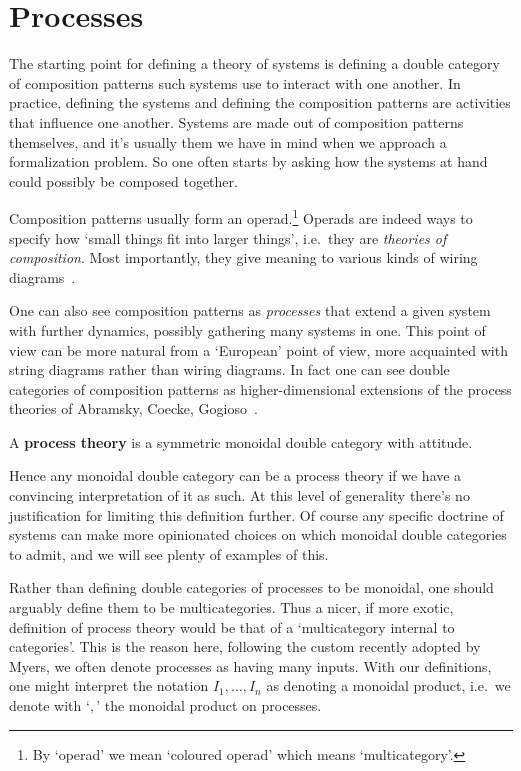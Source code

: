 \section{Processes}
The starting point for defining a theory of systems is defining a double category of composition patterns such systems use to interact with one another.
In practice, defining the systems and defining the composition patterns are activities that influence one another.
Systems are made out of composition patterns themselves, and it's usually them we have in mind when we approach a formalization problem.
So one often starts by asking how the systems at hand could possibly be composed together.

Composition patterns usually form an operad.\footnote{By `operad' we mean `coloured operad' which means `multicategory'.}
Operads are indeed ways to specify how `small things fit into larger things', i.e.~they are \emph{theories of composition}.
Most importantly, they give meaning to various kinds of wiring diagrams~\cite{spivak2013operad,vagner2014algebras, libkind2021operadic}.

One can also see composition patterns as \emph{processes} that extend a given system with further dynamics, possibly gathering many systems in one.
This point of view can be more natural from a `European' point of view, more acquainted with string diagrams rather than wiring diagrams.
In fact one can see double categories of composition patterns as higher-dimensional extensions of the process theories of Abramsky, Coecke, Gogioso~\cite{abramsky2004categorical, coecke2018picturing}.

\begin{definition}
	A \textbf{process theory} is a symmetric monoidal double category with attitude.
\end{definition}

Hence any monoidal double category can be a process theory if we have a convincing interpretation of it as such.
At this level of generality there's no justification for limiting this definition further.
Of course any specific doctrine of systems can make more opinionated choices on which monoidal double categories to admit, and we will see plenty of examples of this.

\begin{remark}
	Rather than defining double categories of processes to be monoidal, one should arguably define them to be multicategories.
	Thus a nicer, if more exotic, definition of process theory would be that of a `multicategory internal to categories'.
	This is the reason here, following the custom recently adopted by Myers, we often denote processes as having many inputs.
	With our definitions, one might interpret the notation $I_1, \ldots, I_n$ as denoting a monoidal product, i.e.~we denote with `$, $' the monoidal product on processes.
\end{remark}

